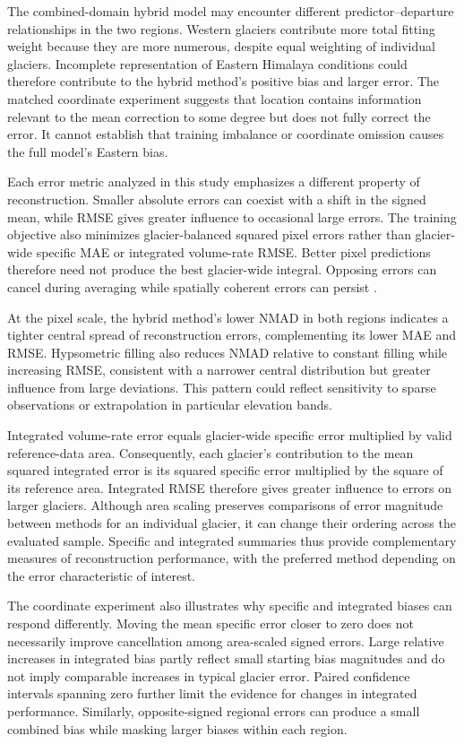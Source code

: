 \documentclass[tc,manuscript]{copernicus}
\begin{document}
The combined-domain hybrid model may encounter different predictor–departure relationships in the two regions. Western glaciers contribute more total fitting weight because they are more numerous, despite equal weighting of individual glaciers. Incomplete representation of Eastern Himalaya conditions could therefore contribute to the hybrid method's positive bias and larger error. The matched coordinate experiment suggests that location contains information relevant to the mean correction to some degree but does not fully correct the error. It cannot establish that training imbalance or coordinate omission causes the full model’s Eastern bias.


Each error metric analyzed in this study emphasizes a different property of reconstruction. Smaller absolute errors can coexist with a shift in the signed mean, while RMSE gives greater influence to occasional large errors. The training objective also minimizes glacier-balanced squared pixel errors rather than glacier-wide specific MAE or integrated volume-rate RMSE. Better pixel predictions therefore need not produce the best glacier-wide integral. Opposing errors can cancel during averaging while spatially coherent errors can persist \citep{rolstad2009,hugonnet2022}.

At the pixel scale, the hybrid method’s lower NMAD in both regions indicates a tighter central spread of reconstruction errors, complementing its lower MAE and RMSE. Hypsometric filling also reduces NMAD relative to constant filling while increasing RMSE, consistent with a narrower central distribution but greater influence from large deviations. This pattern could reflect sensitivity to sparse observations or extrapolation in particular elevation bands.

Integrated volume-rate error equals glacier-wide specific error multiplied by valid reference-data area. Consequently, each glacier’s contribution to the mean squared integrated error is its squared specific error multiplied by the square of its reference area. Integrated RMSE therefore gives greater influence to errors on larger glaciers. Although area scaling preserves comparisons of error magnitude between methods for an individual glacier, it can change their ordering across the evaluated sample. Specific and integrated summaries thus provide complementary measures of reconstruction performance, with the preferred method depending on the error characteristic of interest.

The coordinate experiment also illustrates why specific and integrated biases can respond differently. Moving the mean specific error closer to zero does not necessarily improve cancellation among area-scaled signed errors. Large relative increases in integrated bias partly reflect small starting bias magnitudes and do not imply comparable increases in typical glacier error. Paired confidence intervals spanning zero further limit the evidence for changes in integrated performance. Similarly, opposite-signed regional errors can produce a small combined bias while masking larger biases within each region.
\end{document}
